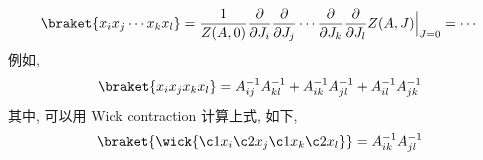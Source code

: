 \begin{itemize}
	\begin{tcolorbox}[title=calculation:]
		\begin{equation}
			\braket{x_i x_j \cdots x_k x_l} = \frac{1}{Z(A, 0)} \frac{\partial}{\partial J_i} \frac{\partial}{\partial J_j} \cdots \frac{\partial}{\partial J_k} \frac{\partial}{\partial J_l} Z(A, J) \Big|_{J = 0} = \cdots
		\end{equation}
		例如,
		\begin{equation}
			\braket{x_i x_j x_k x_l} = A^{- 1}_{i j} A^{- 1}_{k l} + A^{- 1}_{i k} A^{- 1}_{j l} + A^{- 1}_{i l} A^{- 1}_{j k}
		\end{equation}
		其中, 可以用 Wick contraction 计算上式, 如下,
		\begin{equation}
			\braket{\wick{
				\c1 x_i \c2 x_j \c1 x_k \c2 x_l
			}} = A^{- 1}_{i k} A^{- 1}_{j l}
		\end{equation}
	\end{tcolorbox}
\end{itemize}
